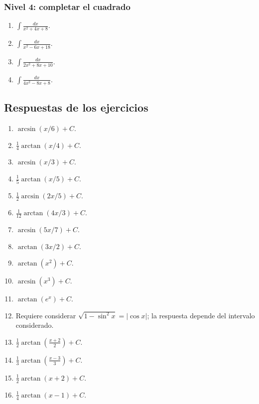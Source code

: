 \subsubsection*{Nivel 4: completar el cuadrado}
\begin{enumerate}[label=\arabic*.,resume]
\item $\displaystyle \int\frac{dx}{x^2+4x+8}$.
\item $\displaystyle \int\frac{dx}{x^2-6x+18}$.
\item $\displaystyle \int\frac{dx}{2x^2+8x+10}$.
\item $\displaystyle \int\frac{dx}{4x^2-8x+8}$.
\end{enumerate}

\subsection{Respuestas de los ejercicios}

\begin{enumerate}[label=\arabic*.]
\item $\displaystyle \arcsin(x/6)+C$.
\item $\displaystyle \frac14\arctan(x/4)+C$.
\item $\displaystyle \arcsin(x/3)+C$.
\item $\displaystyle \frac15\arctan(x/5)+C$.
\item $\displaystyle \frac12\arcsin(2x/5)+C$.
\item $\displaystyle \frac1{12}\arctan(4x/3)+C$.
\item $\displaystyle \arcsin(5x/7)+C$.
\item $\displaystyle \arctan(3x/2)+C$.
\item $\displaystyle \arctan(x^2)+C$.
\item $\displaystyle \arcsin(x^3)+C$.
\item $\displaystyle \arctan(e^x)+C$.
\item Requiere considerar $\sqrt{1-\sin^2x}=|\cos x|$; la respuesta depende del intervalo considerado.
\item $\displaystyle \frac12\arctan\left(\frac{x+2}{2}\right)+C$.
\item $\displaystyle \frac13\arctan\left(\frac{x-3}{3}\right)+C$.
\item $\displaystyle \frac12\arctan(x+2)+C$.
\item $\displaystyle \frac14\arctan(x-1)+C$.
\end{enumerate}

